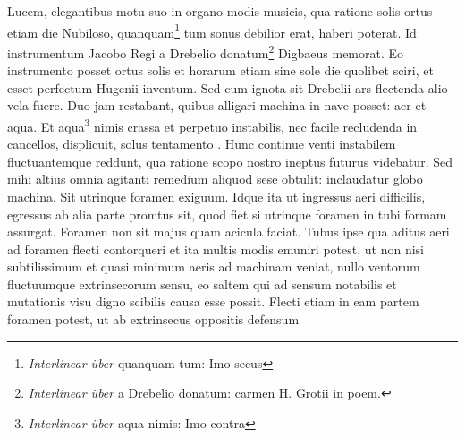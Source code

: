 Lucem, elegantibus motu suo in organo modis musicis, qua ratione solis\protect{} ortus etiam die Nubiloso, quanquam\footnote{\textit{Interlinear \"{u}ber} quanquam tum: Imo secus} tum sonus debilior erat, haberi poterat. Id instrumentum Jacobo Regi\protect{} a Drebelio\protect{} donatum\footnote{\textit{Interlinear \"{u}ber} a Drebelio\protect{} donatum:  carmen H. Grotii\protect{} in poem.} Digbaeus\protect{} memorat. Eo instrumento posset ortus solis\protect{} et horarum  etiam sine sole\protect{} die quolibet sciri, et esset perfectum Hugenii\protect{} inventum. Sed cum ignota sit Drebelii\protect{} ars flectenda alio vela fuere. Duo jam restabant, quibus alligari machina in nave\protect{} posset: aer et aqua. Et aqua\footnote{\textit{Interlinear \"{u}ber} aqua nimis: Imo contra} nimis crassa et perpetuo instabilis, nec facile recludenda in cancellos,  displicuit, solus tentamento . Hunc continue venti instabilem fluctuantemque reddunt, qua ratione scopo nostro ineptus futurus videbatur. Sed mihi altius omnia agitanti remedium aliquod sese obtulit: inclaudatur globo machina. Sit utrinque foramen exiguum. Idque ita ut ingressus aeri difficilis, egressus ab alia parte promtus sit, quod fiet si utrinque foramen in tubi formam assurgat. Foramen non sit majus quam acicula faciat. Tubus ipse qua aditus aeri ad foramen flecti contorqueri et ita multis modis emuniri potest, ut non nisi subtilissimum et quasi minimum aeris ad machinam veniat, nullo ventorum fluctuumque extrinsecorum sensu, eo saltem qui ad sensum notabilis et mutationis visu digno scibilis causa esse possit. Flecti etiam in eam partem foramen potest, ut ab extrinsecus oppositis defensum 